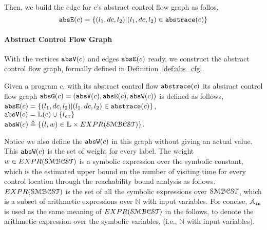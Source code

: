 Then, we build the edge for $c$'s abstract control flow graph as follos,
\[
  \mathtt{abs}{\mathtt{E}}(c) = \{(l_1, dc, l_2) | (l_1, dc, l_2) \in \mathtt{abs}{\mathtt{trace}}(c)\}
  \]

%
\paragraph{Abstract Control Flow Graph} 
With the vertices $\mathtt{abs}{\mathtt{V}}(c)$ and edges $\mathtt{abs}{\mathtt{E}}(c)$ ready, we construct the abstract control flow graph, formally 
defined in 
Definition~\ref{def:abs_cfg}.
%
\begin{defn}
\label{def:abs_cfg}
Given a program $c$, 
with its abstract control flow $\mathtt{abs}{\mathtt{trace}}(c)$
its abstract control flow graph $\mathtt{abs}{\mathtt{G}}(c) =(\mathtt{abs}{\mathtt{V}}(c), \mathtt{abs}{\mathtt{E}}(c), \mathtt{abs}{\mathtt{W}}(c))$ is defined as follows,
\\
$\mathtt{abs}{\mathtt{E}}(c) = \{(l_1, dc, l_2) | (l_1, dc, l_2) \in \mathtt{abs}{\mathtt{trace}}(c)\}$,
\\
$\mathtt{abs}{\mathtt{V}}(c) = \mathbb{L}(c)\cup\{l_{ex}\}$
\\
 $\absW(c) 
\triangleq \left\{ (l, w) \in \mathbb{L} \times EXPR(\constdom) \right\}$.
\end{defn}
Notice we also define the $\mathtt{abs}{\mathtt{W}}(c)$ in this graph without giving an actual value.
This $\mathtt{abs}{\mathtt{W}}(c)$ is the set of weight for every 
label. The weight $w \in EXPR(\mathcal{SMBCST})$ is a symbolic expression over the symbolic constant, 
which is the estimated upper bound on the number of visiting time for every control location
through the reachability bound analysis as follows.
%
$EXPR(\mathcal{SMBCST})$ is the set of all the symbolic expressions 
over $\mathcal{SMBCST}$, which is a subset of arithmetic expressions over $\mathbb{N}$ with input variables.
For concise, $\mathcal{A}_{\mathtt{in}}$ is used as the same meaning of $EXPR(\mathcal{SMBCST})$ in the follows, to denote the arithmetic expression 
over the symbolic variables, (i.e., $\mathbb{N}$ with input variables).
